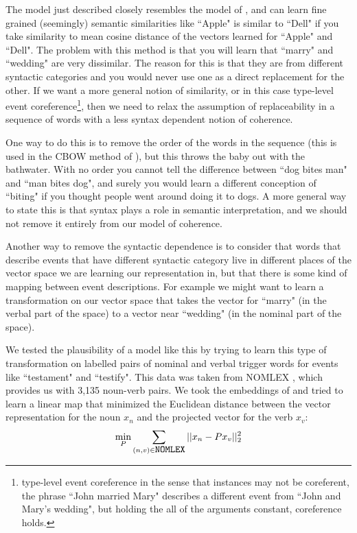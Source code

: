 \documentclass[11pt,letterpaper]{article}
\begin{document}
The model just described closely resembles the model of \cite{rami}, and
can learn fine grained (seemingly) semantic similarities like ``Apple" is
similar to ``Dell" if you take similarity to mean cosine distance of the
vectors learned for ``Apple" and ``Dell".
The problem with this method is that you will learn that ``marry" and
``wedding" are very dissimilar. The reason for this is that they are from
different syntactic categories and you would never use one as a direct replacement
for the other.
If we want a more general notion of similarity, or in this case type-level event
coreference\footnote{type-level event coreference in the sense that instances may
not be coreferent, the phrase ``John married Mary" describes a different event from
``John and Mary's wedding", but holding the all of the arguments constant, coreference holds.},
then we need to relax the assumption of replaceability in a sequence of words with
a less syntax dependent notion of coherence.

One way to do this is to remove the order of the words in the sequence
(this is used in the CBOW method of \cite{DBLP:journals/corr/abs-1301-3781}),
but this throws the baby out with the bathwater. With no order you cannot
tell the difference between ``dog bites man" and ``man bites dog", and surely
you would learn a different conception of ``biting" if you thought people went
around doing it to dogs.
A more general way to state this is that syntax plays a role in semantic interpretation,
and we should not remove it entirely from our model of coherence.

Another way to remove the syntactic dependence is to consider that words that describe events that have
different syntactic category live in different places of the vector space
we are learning our representation in, but that there is some kind of mapping
between event descriptions. For example we might want to learn a transformation
on our vector space that takes the vector for ``marry" (in the verbal part
of the space) to a vector near ``wedding" (in the nominal part of the space).

We tested the plausibility of a model like this by trying to learn this type
of transformation on labelled pairs of nominal and verbal trigger words for events
like ``testament" and ``testify". This data was taken from NOMLEX \cite{nomlex},
which provides us with 3,135 noun-verb pairs.
We took the embeddings of \cite{rami} and tried to learn a linear map that minimized
the Euclidean distance between the vector representation for the noun $x_n$ and the
projected vector for the verb $x_v$:
\[
	\min_P \sum_{(n,v) \in \mbox{\texttt{NOMLEX}}}
		|| x_n - P x_v ||_2^2
\]
\end{document}
